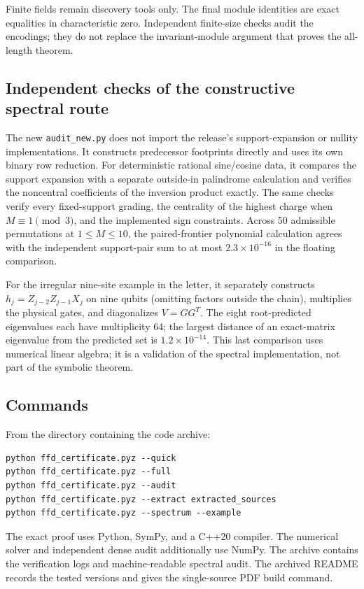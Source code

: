 \documentclass[10pt,letterpaper]{article}
\newcommand{\code}[1]{\nolinkurl{#1}}
\begin{document}
Finite fields remain discovery tools only. The final module identities are exact equalities in characteristic zero. Independent finite-size checks audit the encodings; they do not replace the invariant-module argument that proves the all-length theorem.

\subsection{Independent checks of the constructive spectral route}
The new \code{audit_new.py} does not import the release's support-expansion or nullity implementations. It constructs predecessor footprints directly and uses its own binary row reduction. For deterministic rational sine/cosine data, it compares the support expansion with a separate outside-in palindrome calculation and verifies the noncentral coefficients of the inversion product exactly. The same checks verify every fixed-support grading, the centrality of the highest charge when $M\equiv1\pmod3$, and the implemented sign constraints. Across 50 admissible permutations at $1\le M\le10$, the paired-frontier polynomial calculation agrees with the independent support-pair sum to at most $2.3\times10^{-16}$ in the floating comparison.

For the irregular nine-site example in the letter, it separately constructs $h_j=Z_{j-2}Z_{j-1}X_j$ on nine qubits (omitting factors outside the chain), multiplies the physical gates, and diagonalizes $V=GG^T$. The eight root-predicted eigenvalues each have multiplicity 64; the largest distance of an exact-matrix eigenvalue from the predicted set is $1.2\times10^{-14}$. This last comparison uses numerical linear algebra; it is a validation of the spectral implementation, not part of the symbolic theorem.

\subsection{Commands}
From the directory containing the code archive:
\begin{lstlisting}
python ffd_certificate.pyz --quick
python ffd_certificate.pyz --full
python ffd_certificate.pyz --audit
python ffd_certificate.pyz --extract extracted_sources
python ffd_certificate.pyz --spectrum --example
\end{lstlisting}
The exact proof uses Python, SymPy, and a C++20 compiler. The numerical solver and independent dense audit additionally use NumPy. The archive contains the verification logs and machine-readable spectral audit. The archived README records the tested versions and gives the single-source PDF build command.
\end{document}
